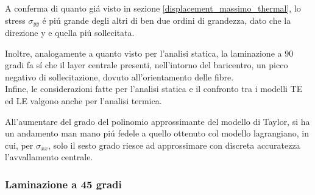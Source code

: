 \documentclass{article}
\begin{document}
            A conferma di quanto giá visto in sezione \ref{displacement_massimo_thermal}, lo stress $\sigma_{yy}$
            é piú grande degli altri di ben due ordini di grandezza, dato che la direzione y e quella piú sollecitata.

            Inoltre, analogamente a quanto visto per l'analisi statica, la laminazione a 90 gradi fa sí che il layer 
            centrale presenti, nell'intorno del baricentro, un picco negativo di sollecitazione, dovuto all'orientamento delle fibre. \\ 

            Infine, le considerazioni fatte per l'analisi statica e il confronto tra i modelli TE ed LE valgono anche per l'analisi termica.
            
            All'aumentare del grado del polinomio approssimante del modello di Taylor, si ha un andamento man mano piú fedele a quello ottenuto 
            col modello lagrangiano, in cui, per $\sigma_{xx}$, solo il sesto grado riesce ad approssimare con discreta accuratezza
            l'avvallamento centrale.

            
        

            \clearpage 

            \subsubsection{Laminazione a 45 gradi\label{termica_stress_45}}
\end{document}
